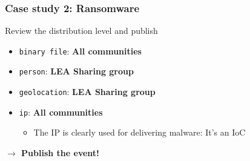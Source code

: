 \begin{frame}
    \frametitle{Case study 2: Ransomware}
    Review the distribution level and publish
    \begin{itemize}
        \item \texttt{binary file}: \textbf{All communities}
        \item \texttt{person}: \textbf{LEA Sharing group}
        \item \texttt{geolocation}: \textbf{LEA Sharing group}
        \item \texttt{ip}: \textbf{All communities}
        \begin{itemize}
            \item The IP is clearly used for delivering malware: It's an IoC
        \end{itemize}
    \end{itemize}
    \begin{center}
        \textbf{$\rightarrow$ Publish the event!}
    \end{center}
\end{frame}
